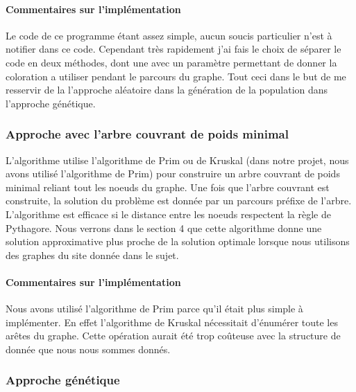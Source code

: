 \documentclass[10pt,a4paper]{report}
\begin{document}
		\paragraph{Commentaires sur l'implémentation\\}
		\begin{flushleft}
		Le code de ce programme étant assez simple, aucun soucis particulier n'est à notifier dans ce code. Cependant très rapidement j'ai fais le choix de séparer le code en deux méthodes, dont une avec un paramètre permettant de donner la coloration a utiliser pendant le parcours du graphe. Tout ceci dans le but de me resservir de la l'approche aléatoire dans la génération de la population dans l'approche génétique.
		\end{flushleft}
		
		\subsubsection{Approche avec l'arbre couvrant de poids minimal}
		\begin{flushleft}
		L'algorithme utilise l'algorithme de Prim ou de Kruskal (dans notre projet, nous avons utilisé l'algorithme de Prim) pour construire un arbre couvrant de poids minimal reliant tout les noeuds du graphe. Une fois que l'arbre couvrant est construite, la solution du problème est donnée par un parcours préfixe de l'arbre.
		L'algorithme est efficace si le distance entre les noeuds respectent la règle de Pythagore. Nous verrons dans le section 4 que cette algorithme donne une solution approximative plus proche de la solution optimale lorsque nous utilisons des graphes du site donnée dans le sujet.
		\end{flushleft}
			
		\paragraph{Commentaires sur l'implémentation}
		
		\begin{flushleft}
		Nous avons utilisé l'algorithme de Prim parce qu'il était plus simple à implémenter. En effet l'algorithme de Kruskal nécessitait d’énumérer toute les arêtes du graphe. Cette opération aurait été trop coûteuse avec la structure de donnée que nous nous sommes donnés.
		\end{flushleft}
		
	\subsubsection{Approche génétique}
\end{document}
